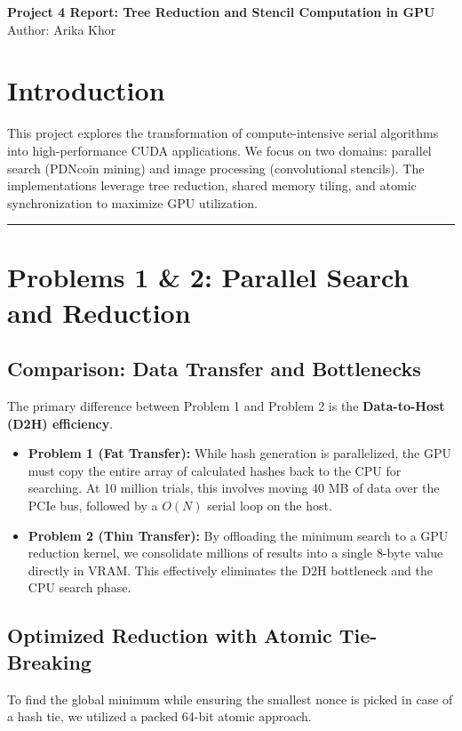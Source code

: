 \documentclass[11pt]{article}
\begin{document}
\begin{center}
    {\Large \textbf{\color{white}Project 4 Report: Tree Reduction and Stencil Computation in GPU}}\\
    \vspace{0.5em}
    Author: Arika Khor
\end{center}

\vspace{1em}

\section*{\color{white}Introduction}
This project explores the transformation of compute-intensive serial algorithms into high-performance CUDA applications. We focus on two domains: parallel search (PDNcoin mining) and image processing (convolutional stencils). The implementations leverage tree reduction, shared memory tiling, and atomic synchronization to maximize GPU utilization.

\noindent\rule{\textwidth}{0.4pt}

\section*{\color{white}Problems 1 \& 2: Parallel Search and Reduction}

\subsection*{Comparison: Data Transfer and Bottlenecks}
The primary difference between Problem 1 and Problem 2 is the \textbf{Data-to-Host (D2H) efficiency}.
\begin{itemize}
    \item \textbf{Problem 1 (Fat Transfer):} While hash generation is parallelized, the GPU must copy the entire array of calculated hashes back to the CPU for searching. At 10 million trials, this involves moving 40 MB of data over the PCIe bus, followed by a $O(N)$ serial loop on the host.
    \item \textbf{Problem 2 (Thin Transfer):} By offloading the minimum search to a GPU reduction kernel, we consolidate millions of results into a single 8-byte value directly in VRAM. This effectively eliminates the D2H bottleneck and the CPU search phase.
\end{itemize}

\subsection*{Optimized Reduction with Atomic Tie-Breaking}
To find the global minimum while ensuring the smallest nonce is picked in case of a hash tie, we utilized a packed 64-bit atomic approach.
\end{document}

